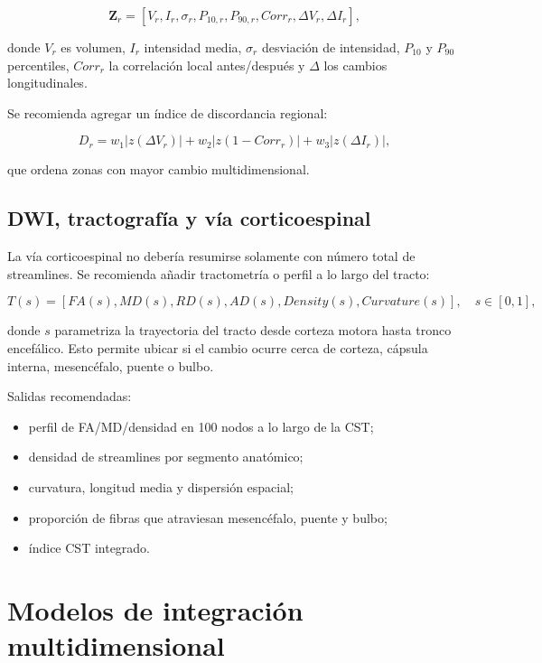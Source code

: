 \documentclass[conference]{IEEEtran}
\begin{document}
\begin{equation}
\mathbf{Z}_{r} = [V_r, I_r, \sigma_r, P_{10,r}, P_{90,r}, Corr_r, \Delta V_r, \Delta I_r],
\end{equation}

donde $V_r$ es volumen, $I_r$ intensidad media, $\sigma_r$ desviación de intensidad, $P_{10}$ y $P_{90}$ percentiles, $Corr_r$ la correlación local antes/después y $\Delta$ los cambios longitudinales.

Se recomienda agregar un índice de discordancia regional:

\begin{equation}
D_r = w_1 |z(\Delta V_r)| + w_2 |z(1-Corr_r)| + w_3 |z(\Delta I_r)|,
\end{equation}

que ordena zonas con mayor cambio multidimensional.

\subsection{DWI, tractografía y vía corticoespinal}
La vía corticoespinal no debería resumirse solamente con número total de streamlines. Se recomienda añadir tractometría o perfil a lo largo del tracto:

\begin{equation}
T(s) = [FA(s), MD(s), RD(s), AD(s), Density(s), Curvature(s)], \quad s \in [0,1],
\end{equation}

donde $s$ parametriza la trayectoria del tracto desde corteza motora hasta tronco encefálico. Esto permite ubicar si el cambio ocurre cerca de corteza, cápsula interna, mesencéfalo, puente o bulbo.

Salidas recomendadas:

\begin{itemize}[leftmargin=*]
    \item perfil de FA/MD/densidad en 100 nodos a lo largo de la CST;
    \item densidad de streamlines por segmento anatómico;
    \item curvatura, longitud media y dispersión espacial;
    \item proporción de fibras que atraviesan mesencéfalo, puente y bulbo;
    \item índice CST integrado.
\end{itemize}

\section{Modelos de integración multidimensional}
\end{document}
